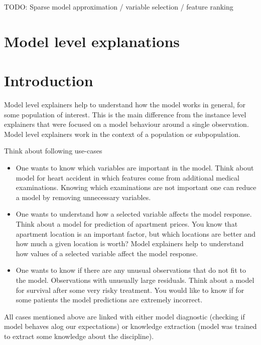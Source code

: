 \documentclass[12pt,]{krantz}
\providecommand{\tightlist}{%
  \setlength{\itemsep}{0pt}\setlength{\parskip}{0pt}}
\theoremstyle{definition}
\theoremstyle{definition}
\theoremstyle{definition}
\theoremstyle{remark}
\begin{document}
TODO: Sparse model approximation / variable selection / feature ranking

\hypertarget{model-level-explanations}{%
\section*{Model level explanations}\label{model-level-explanations}}

\hypertarget{introduction-6}{%
\section{Introduction}\label{introduction-6}}

Model level explainers help to understand how the model works in
general, for some population of interest. This is the main difference
from the instance level explainers that were focused on a model
behaviour around a single observation. Model level explainers work in
the context of a population or subpopulation.

Think about following use-cases

\begin{itemize}
\tightlist
\item
  One wants to know which variables are important in the model. Think
  about model for heart accident in which features come from additional
  medical examinations. Knowing which examinations are not important one
  can reduce a model by removing unnecessary variables.
\item
  One wants to understand how a selected variable affects the model
  response. Think about a model for prediction of apartment prices. You
  know that apartment location is an important factor, but which
  locations are better and how much a given location is worth? Model
  explainers help to understand how values of a selected variable affect
  the model response.
\item
  One wants to know if there are any unusual observations that do not
  fit to the model. Observations with unusually large residuals. Think
  about a model for survival after some very risky treatment. You would
  like to know if for some patients the model predictions are extremely
  incorrect.
\end{itemize}

All cases mentioned above are linked with either model diagnostic
(checking if model behaves alog our expectations) or knowledge
extraction (model was trained to extract some knowledge about the
discipline).
\end{document}
